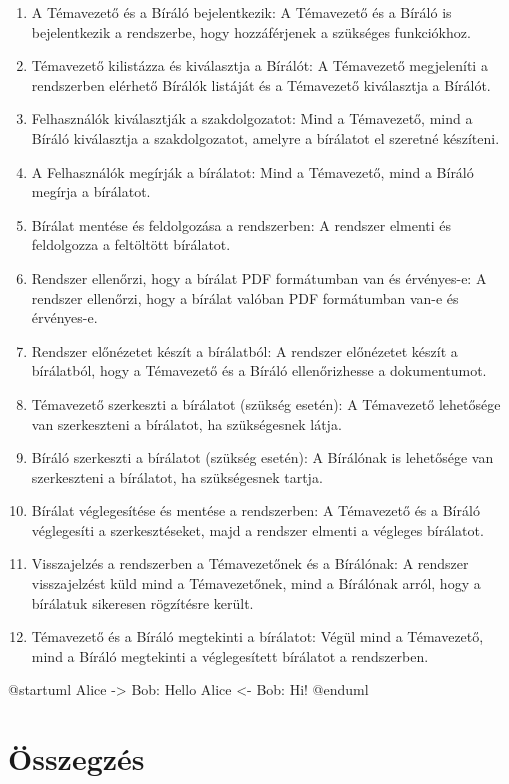 \documentclass[a4paper,12pt]{article}
\begin{document}
\begin{enumerate}
\item A Témavezető és a Bíráló bejelentkezik: A Témavezető és a Bíráló is bejelentkezik a rendszerbe, hogy hozzáférjenek a szükséges funkciókhoz.

\item Témavezető kilistázza és kiválasztja a Bírálót: A Témavezető megjeleníti a rendszerben elérhető Bírálók listáját és a Témavezető kiválasztja a Bírálót.

\item Felhasználók kiválasztják a szakdolgozatot: Mind a Témavezető, mind a Bíráló kiválasztja a szakdolgozatot, amelyre a bírálatot el szeretné készíteni.

\item A Felhasználók megírják a bírálatot: Mind a Témavezető, mind a Bíráló megírja a bírálatot.

\item Bírálat mentése és feldolgozása a rendszerben: A rendszer elmenti és feldolgozza a feltöltött bírálatot.

\item Rendszer ellenőrzi, hogy a bírálat PDF formátumban van és érvényes-e: A rendszer ellenőrzi, hogy a bírálat valóban PDF formátumban van-e és érvényes-e.

\item Rendszer előnézetet készít a bírálatból: A rendszer előnézetet készít a bírálatból, hogy a Témavezető és a Bíráló ellenőrizhesse a dokumentumot.

\item Témavezető szerkeszti a bírálatot (szükség esetén): A Témavezető lehetősége van szerkeszteni a bírálatot, ha szükségesnek látja.

\item Bíráló szerkeszti a bírálatot (szükség esetén): A Bírálónak is lehetősége van szerkeszteni a bírálatot, ha szükségesnek tartja.

\item Bírálat véglegesítése és mentése a rendszerben: A Témavezető és a Bíráló véglegesíti a szerkesztéseket, majd a rendszer elmenti a végleges bírálatot.

\item Visszajelzés a rendszerben a Témavezetőnek és a Bírálónak: A rendszer visszajelzést küld mind a Témavezetőnek, mind a Bírálónak arról, hogy a bírálatuk sikeresen rögzítésre került.

\item Témavezető és a Bíráló megtekinti a bírálatot: Végül mind a Témavezető, mind a Bíráló megtekinti a véglegesített bírálatot a rendszerben.
\end{enumerate}

\begin{plantuml}
	@startuml
	Alice -> Bob: Hello
	Alice <- Bob: Hi!
	@enduml
\end{plantuml}

\section{Összegzés}
\end{document}
